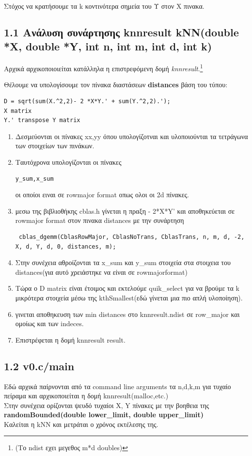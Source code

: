 \documentclass[10pt]{report}
\begin{document}
Στόχος να κρατήσουμε τα k κοντινότερα σημεία του Υ  στον X πινακα.
\subsection{1.1 Ανάλυση συνάρτησης \textbf{knnresult kNN(double *X, double *Y, int n, int m, int d, int k)} }
Αρχικά αρχικοποιοιείται κατάλληλα η επιστρεφόμενη δομή \emph{knnresult}.\footnote{(Το ndist εχει μεγεθος m*d doubles)}

Θέλουμε να υπολογίσουμε τον πίνακα διαστάσεων \textbf{distances} βάση του τύπου:

\begin{verbatim}
D = sqrt(sum(X.^2,2)- 2 *X*Y.' + sum(Y.^2,2).');
X matrix
Y.' transpose Y matrix
\end{verbatim}

\begin{enumerate}
\item Δεσμεύονται οι πίνακες xx,yy όπου υπολογίζοτναι και υλοποιούνται τα τετράγωνα των στοιχείων των πινάκων.
\item Ταυτόχρονα υπολογίζονται οι πίνακες \begin{verbatim}
y_sum,x_sum
\end{verbatim}οι οποίοι ειναι σε rowmajor format οπως ολοι οι 2d πίνακες.

\quad\item μεσω της βιβλιοθήκης cblas.h γίνεται η πραξη  - 2*X*Y' και αποθηκεύεται σε rowmajor format στον πινακα distances με την συνάρτηση \begin{verbatim}
 cblas_dgemm(CblasRowMajor, CblasNoTrans, CblasTrans, n, m, d, -2, X, d, Y, d, 0, distances, m);
\end{verbatim}
\item Στην συνέχεια αθροίζονται τα x\_sum και y\_sum στοιχεία στα στοιχεια του distances(για αυτό χρειάστηκε να είναι σε rowmajorformat)
\item Τώρα ο D matrix είναι έτοιμος και εκτελούμε quik\_select για να βρούμε τα k μικρότερα στοιχεία μέσω της kthSmallest(εδώ γίνεται μια πιο απλή υλοποίηση).
\item γινεται αποθηκευση των min distances στο knnresult.ndist σε row\_major και ομοίως και των indeces.
\item Επιστρέφεται η δομή knnresult result.
\end{enumerate}


\subsection{1.2 v0.c/main}
Εδώ αρχικά παίρνονται από τα command line arguments τα n,d,k,m για τυχαίο πείραμα και αρχικοποιείται η δομή knnresult(malloc,etc.)\\
Στην συνέχεια ορίζονται ψευδό τυχαίοι X, Y πίνακες με την βοηθεια της \textbf{randomBounded(double lower\_limit, double upper\_limit)}\\
Καλείται η kNN και μετράται ο χρόνος εκτέλεσης της.
\end{document}
